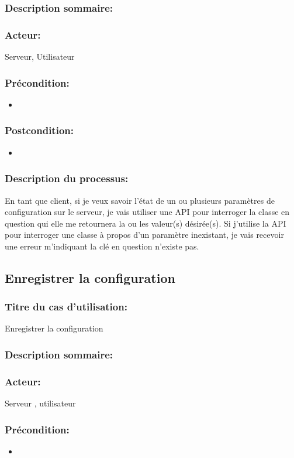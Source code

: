 \documentclass{scrreprt}
\begin{document}
\subsubsection{Description sommaire:}
\subsubsection{Acteur:} Serveur, Utilisateur
\subsubsection{Précondition:}
\begin{itemize}
    \item  
\end{itemize} 
\subsubsection{Postcondition:}
\begin{itemize}
    \item  
\end{itemize} 
\subsubsection{Description du processus:}En tant que client, si je veux savoir l'état de un ou plusieurs paramètres de
configuration sur le serveur, je vais utiliser une API pour interroger la
classe en question qui elle me retournera la ou les valeur(s) désirée(s).
Si j'utilise la API pour interroger une classe à propos d'un paramètre
inexistant, je vais recevoir une erreur m'indiquant la clé en question
n'existe pas.

\subsection{Enregistrer la configuration}
\subsubsection{Titre du cas d'utilisation:} Enregistrer la configuration
\subsubsection{Description sommaire:}
\subsubsection{Acteur:} Serveur , utilisateur
\subsubsection{Précondition:}
\begin{itemize}
    \item  
\end{itemize} 
\end{document}
